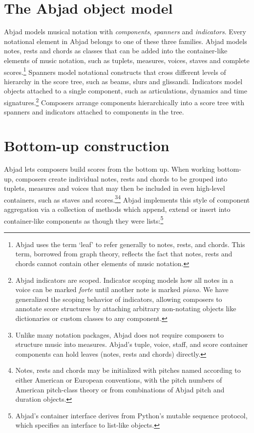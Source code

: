 \documentclass{article}
\begin{document}
\section{The Abjad object model} \label{sec:object-model}

Abjad models musical notation with \emph{components}, \emph{spanners} and
\emph{indicators}. Every notational element in Abjad belongs to one of these
three families. Abjad models notes, rests and chords as classes that can be
added into the container-like elements of music notation, such as tuplets,
measures, voices, staves and complete scores.\footnote{Abjad uses the term
`leaf' to refer generally to notes, rests, and chords. This term, borrowed from
graph theory, reflects the fact that notes, rests and chords cannot contain
other elements of music notation.} Spanners model notational constructs that
cross different levels of hierarchy in the score tree, such as beams, slurs and
glissandi. Indicators model objects attached to a single component, such as
articulations, dynamics and time signatures.\footnote{Abjad indicators are
scoped. Indicator scoping models how all notes in a voice can be marked
\emph{forte} until another note is marked \emph{piano}. We have generalized the
scoping behavior of indicators, allowing composers to annotate score structures
by attaching arbitrary non-notating objects like dictionaries or custom classes
to any component.} Composers arrange components hierarchically into a score
tree with spanners and indicators attached to components in the tree.

\section{Bottom-up construction} \label{sec:bottom-up}

Abjad lets composers build scores from the bottom up. When working bottom-up,
composers create individual notes, rests and chords to be grouped into tuplets,
measures and voices that may then be included in even high-level containers,
such as staves and scores.\footnote{Unlike many notation packages, Abjad does
not require composers to structure music into measures. Abjad's tuple, voice,
staff, and score container components can hold leaves (notes, rests and chords)
directly.}\footnote{Notes, rests and chords may be initialized with pitches named according to either American or European conventions, with the pitch numbers of American pitch-class theory or from combinations of Abjad pitch and duration objects.} Abjad implements this style of component aggregation via a
collection of methods which append, extend or insert into container-like
components as though they were lists:\footnote{Abjad's container interface
derives from Python's mutable sequence protocol, which specifies an interface
to list-like objects.}
\end{document}
